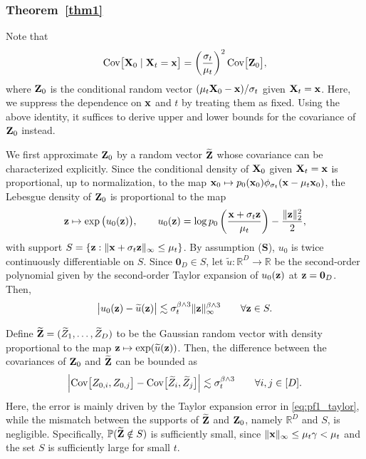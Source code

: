 \documentclass[11pt,a4paper,final]{article}
\numberwithin{equation}{section}
\theoremstyle{remark}
\newcommand{\bS}{{\bf S}}
\newcommand{\bx}{{\bf x}}
\newcommand{\bX}{{\bf X}}
\newcommand{\bz}{{\bf z}}
\newcommand{\bZ}{{\bf Z}}
\newcommand{\bbR}{{\mathbb R}}
\newcommand{\bbP}{{\mathbb P}}
\newcommand{\Cov}{\mbox{{\rm Cov}}}
\newcommand{\be}{\begin{equation}}
\newcommand{\ee}{\end{equation}}
\newcommand{\bean}{\setlength\arraycolsep{1pt}\begin{eqnarray*}}
\newcommand{\eean}{\end{eqnarray*}}
\begin{document}
\subsubsection{Theorem~\ref{thm1}}

Note that
\bean
{\rm{Cov}} \big[ \bX_{0} \mid \bX_{t} = \bx \big] =  \left( \frac{\sigma_t}{\mu_t} \right)^2 \Cov \big[ \bZ_{0} \big],
\label{eq:pf1_change}
\eean
where $\bZ_{0}$ is the conditional random vector $(\mu_{t}\bX_{0} -\bx)/\sigma_{t}$ given $\bX_{t} = \bx$.
Here, we suppress the dependence on $\bx$ and $t$ by treating them as fixed.
Using the above identity, it suffices to derive upper and lower bounds for the covariance of $\bZ_{0}$ instead.

We first approximate $\bZ_{0}$ by a random vector $\widetilde \bZ$ whose covariance can be characterized explicitly.
Since the conditional density of $\bX_{0}$ given $\bX_{t} = \bx$ is proportional, up to normalization, to the map $\bx_{0} \mapsto p_{0}(\bx_{0}) \phi_{\sigma_{t}} (\bx - \mu_{t} \bx_{0})$, the Lebesgue density of $\bZ_{0}$ is proportional to the map
\bean
\bz \mapsto \exp \big( u_{0} (\bz) \big),
\qquad 
u_{0} (\bz) =  \log p_{0} \left( \frac{\bx + \sigma_t \bz}{\mu_t} \right) -  \frac{\| \bz \|_2^2}{2},
\eean
with support $S = \{ \bz : \| \bx + \sigma_{t} \bz \|_{\infty} \leq \mu_{t} \}$.
By assumption (\bS), $u_{0}$ is twice continuously differentiable on $S$.
Since $\mathbf{0}_{D} \in S$, let $\widetilde u : \bbR^{D} \to \bbR$ be the second-order polynomial given by the second-order Taylor expansion of $u_{0}(\bz)$ at $\bz = \mathbf{0}_{D}$. Then,
\be
\big\vert u_{0}(\bz) - \widetilde u(\bz) \big\vert \lesssim \sigma_{t}^{\beta \wedge 3} \| \bz \|_{\infty}^{\beta \wedge 3} \qquad \forall \bz \in S.
\label{eq:pf1_taylor}
\ee

Define $\widetilde \bZ = (\widetilde Z_{1},\ldots,\widetilde Z_{D})$ to be the Gaussian random vector with density proportional to the map $\bz \mapsto \exp(\widetilde u(\bz))$.
Then, the difference between the covariances of $\bZ_{0}$ and $\widetilde \bZ$ can be bounded as
\be
\Big\vert {\rm Cov} \big[ Z_{0,i}, Z_{0,j} \big] - {\rm Cov} \big[ \widetilde Z_{i}, \widetilde Z_{j} \big] \Big\vert
\lesssim \sigma_{t}^{\beta \wedge 3} \qquad \forall i,j \in [D].
\label{eq:pf1_gau_err}
\ee
Here, the error is mainly driven by the Taylor expansion error in \eqref{eq:pf1_taylor}, while the mismatch between the supports of $\widetilde \bZ$ and $\bZ_{0}$, namely $\bbR^{D}$ and $S$, is negligible.
Specifically, $\bbP (\widetilde \bZ \notin S)$ is sufficiently small, since $\| \bx \|_{\infty} \leq \mu_{t}\gamma < \mu_{t}$ and the set $S$ is sufficiently large for small $t$.
\end{document}
